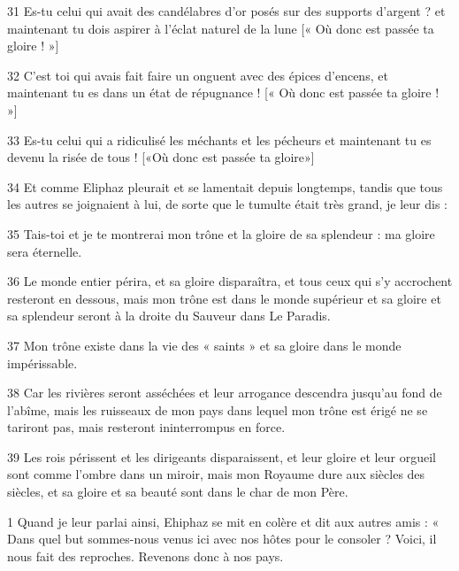 \par 31 Es-tu celui qui avait des candélabres d'or posés sur des supports d'argent ? et maintenant tu dois aspirer à l'éclat naturel de la lune [« Où donc est passée ta gloire ! »]

\par 32 C'est toi qui avais fait faire un onguent avec des épices d'encens, et maintenant tu es dans un état de répugnance ! [« Où donc est passée ta gloire ! »]

\par 33 Es-tu celui qui a ridiculisé les méchants et les pécheurs et maintenant tu es devenu la risée de tous ! [«Où donc est passée ta gloire»]

\par 34 Et comme Eliphaz pleurait et se lamentait depuis longtemps, tandis que tous les autres se joignaient à lui, de sorte que le tumulte était très grand, je leur dis :

\par 35 Tais-toi et je te montrerai mon trône et la gloire de sa splendeur : ma gloire sera éternelle.

\par 36 Le monde entier périra, et sa gloire disparaîtra, et tous ceux qui s'y accrochent resteront en dessous, mais mon trône est dans le monde supérieur et sa gloire et sa splendeur seront à la droite du Sauveur dans Le Paradis.

\par 37 Mon trône existe dans la vie des « saints » et sa gloire dans le monde impérissable.

\par 38 Car les rivières seront asséchées et leur arrogance descendra jusqu'au fond de l'abîme, mais les ruisseaux de mon pays dans lequel mon trône est érigé ne se tariront pas, mais resteront ininterrompus en force.

\par 39 Les rois périssent et les dirigeants disparaissent, et leur gloire et leur orgueil sont comme l'ombre dans un miroir, mais mon Royaume dure aux siècles des siècles, et sa gloire et sa beauté sont dans le char de mon Père.


\par 1 Quand je leur parlai ainsi, Ehiphaz se mit en colère et dit aux autres amis : « Dans quel but sommes-nous venus ici avec nos hôtes pour le consoler ? Voici, il nous fait des reproches. Revenons donc à nos pays.

